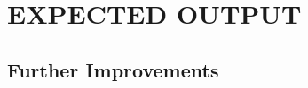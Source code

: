 \documentclass[main]{subfiles}
\begin{document}
\chapter{\MakeUppercase{EXPECTED OUTPUT}}


\section{Further Improvements}
\end{document}
